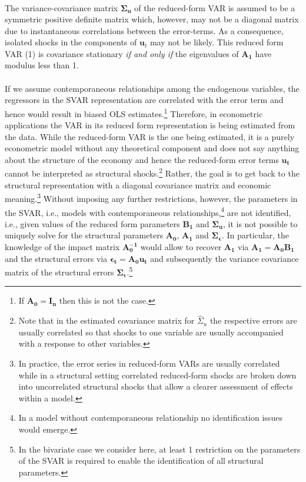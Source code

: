 \documentclass[a4paper,11pt,listof=nochaptergap,oneside,pointednumbers,bibtotoc,bigheadings,liststotoc]{scrbook}
\theoremstyle{mysatz}
\theoremstyle{mydefinition}
\theoremstyle{mybemerkung}
\newcommand{\vect}[1]{\boldsymbol{\mathbf{#1}}}
\begin{document}
\begin{itemize}
\begin{equation}
\begin{split}
\end{split}								
\end{equation}
The variance-covariance matrix $\vect{\Sigma_u}$ of the reduced-form VAR is assumed to be a symmetric positive definite matrix which, however, may not be a diagonal matrix due to instantaneous correlations between the error-terms. As a consequence, isolated shocks in the components of $\vect{u}_t$ may not be likely. This reduced form VAR (1) is covariance stationary \textit{if and only if} the eigenvalues of $\vect{A_1}$ have modulus less than 1. \\
\\
If we assume contemporaneous relationships among the endogenous variables, the regressors in the SVAR representation are correlated with the error term and hence would result in biased OLS estimates.\footnote{If $\vect{A_0} = \vect{I_n}$ then this is not the case.} Therefore, in econometric applications the VAR in its reduced form representation is being estimated from the data. While the reduced-form VAR is the one being estimated, it is a purely econometric model without any theoretical component and does not say anything about the structure of the economy and hence the reduced-form error terms $\vect{u_t}$ cannot be interpreted as structural shocks.\footnote{Note that in the estimated covariance matrix for ${\hat{\Sigma}_u}$ the respective errors are usually correlated so that shocks to one variable are usually accompanied with a response to other variables.} Rather, the goal is to get back to the structural representation with a diagonal covariance matrix and economic meaning.\footnote{In practice, the error series in reduced-form VARs are usually correlated while in a structural setting correlated reduced-form shocks are broken down into uncorrelated structural shocks that allow a clearer assessment of effects within a model.} Without imposing any further restrictions, however, the parameters in the SVAR, i.e., models with contemporaneous relationships,\footnote{In a model without contemporaneous relationship no identification issues would emerge.} are not identified, i.e., given values of the reduced form parameters $\vect{B_1}$ and $\vect{\Sigma_u}$, it is not possible to uniquely solve for the structural parameters $\vect{A_0}$, $\vect{A_1}$ and $\vect{\Sigma_\epsilon}$. In particular, the knowledge of the impact matrix $\vect{A_0^{-1}}$ would allow to recover $\vect{A_1}$ via $\vect{A_1} = \vect{A_0}\vect{B_1}$ and the structural errors via $\vect{\epsilon_t} = \vect{A_0}\vect{u_t}$ and subsequently the variance covariance matrix of the structural errors $\vect{\Sigma_\epsilon}$.\footnote{In the bivariate case we consider here, at least 1 restriction on the parameters of the SVAR is required to enable the identification of all structural parameters. }\\

\end{itemize}
\end{document}
